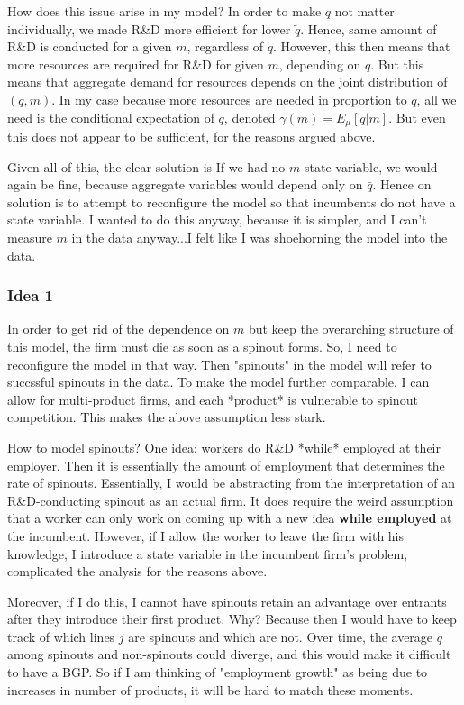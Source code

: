 \documentclass[12pt,english]{article}
\theoremstyle{remark}
\begin{document}
How does this issue arise in my model? In order to make $q$ not matter individually, we made R\&D more efficient for lower $\tilde{q}$. Hence, same amount of R\&D is conducted for a given $m$, regardless of $q$. However, this then means that more resources are required for R\&D for given $m$, depending on $q$. But this means that aggregate demand for resources depends on the joint distribution of $(q,m)$. In my case because more resources are needed in proportion to $q$, all we need is the conditional expectation of $q$, denoted $\gamma(m) = E_{\mu}[q |m]$. But even this does not appear to be sufficient, for the reasons argued above. 

Given all of this, the clear solution is If we had no $m$ state variable, we would again be fine, because aggregate variables would depend only on $\bar{q}$. Hence on solution is to attempt to reconfigure the model so that incumbents do not have a state variable. I wanted to do this anyway, because it is simpler, and I can't measure $m$ in the data anyway...I felt like I was shoehorning the model into the data.

\subsubsection{Idea 1}

In order to get rid of the dependence on $m$ but keep the overarching structure of this model, the firm must die as soon as a spinout forms. So, I need to reconfigure the model in that way. Then "spinouts" in the model will refer to succssful spinouts in the data. To make the model further comparable, I can allow for multi-product firms, and each *product* is vulnerable to spinout competition. This makes the above assumption less stark.

How to model spinouts? One idea: workers do R\&D *while* employed at their employer. Then it is essentially the amount of employment that determines the rate of spinouts. Essentially, I would be abstracting from the interpretation of an R\&D-conducting spinout as an actual firm. It does require the weird assumption that a worker can only work on coming up with a new idea \textbf{while employed} at the incumbent. However, if I allow the worker to leave the firm with his knowledge, I introduce a state variable in the incumbent firm's problem, complicated the analysis for the reasons above. 

Moreover, if I do this, I cannot have spinouts retain an advantage over entrants after they introduce their first product. Why? Because then I would have to keep track of which lines $j$ are spinouts and which are not. Over time, the average $q$ among spinouts and non-spinouts could diverge, and this would make it difficult to have a BGP. So if I am thinking of "employment growth" as being due to increases in number of products, it will be hard to match these moments. 
\end{document}

